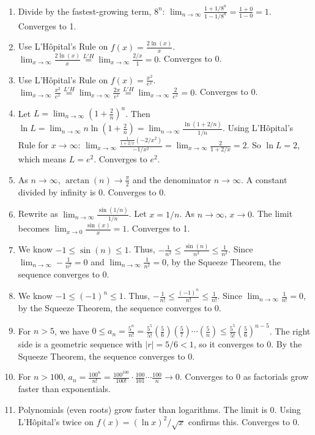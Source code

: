 \documentclass{article}
\begin{document}
\begin{enumerate}
    \item Divide by the fastest-growing term, $8^n$: $\lim_{n\to\infty} \frac{1 + 1/8^n}{1 - 1/8^n} = \frac{1+0}{1-0} = 1$. Converges to 1.
    \item Use L'Hôpital's Rule on $f(x) = \frac{2\ln(x)}{x}$. $\lim_{x\to\infty} \frac{2\ln(x)}{x} \overset{L'H}{=} \lim_{x\to\infty} \frac{2/x}{1} = 0$. Converges to 0.
    \item Use L'Hôpital's Rule on $f(x) = \frac{x^2}{e^x}$. $\lim_{x\to\infty} \frac{x^2}{e^x} \overset{L'H}{=} \lim_{x\to\infty} \frac{2x}{e^x} \overset{L'H}{=} \lim_{x\to\infty} \frac{2}{e^x} = 0$. Converges to 0.
    \item Let $L = \lim_{n\to\infty} (1 + \frac{2}{n})^n$. Then $\ln L = \lim_{n\to\infty} n \ln(1 + \frac{2}{n}) = \lim_{n\to\infty} \frac{\ln(1+2/n)}{1/n}$. Using L'Hôpital's Rule for $x \to \infty$: $\lim_{x\to\infty} \frac{\frac{1}{1+2/x}(-2/x^2)}{-1/x^2} = \lim_{x\to\infty} \frac{2}{1+2/x} = 2$. So $\ln L = 2$, which means $L=e^2$. Converges to $e^2$.
    \item As $n \to \infty$, $\arctan(n) \to \frac{\pi}{2}$ and the denominator $n \to \infty$. A constant divided by infinity is 0. Converges to 0.
    \item Rewrite as $\lim_{n\to\infty} \frac{\sin(1/n)}{1/n}$. Let $x = 1/n$. As $n\to\infty$, $x\to 0$. The limit becomes $\lim_{x\to 0} \frac{\sin(x)}{x} = 1$. Converges to 1.
    \item We know $-1 \le \sin(n) \le 1$. Thus, $-\frac{1}{n^2} \le \frac{\sin(n)}{n^2} \le \frac{1}{n^2}$. Since $\lim_{n\to\infty} -\frac{1}{n^2} = 0$ and $\lim_{n\to\infty} \frac{1}{n^2} = 0$, by the Squeeze Theorem, the sequence converges to 0.
    \item We know $-1 \le (-1)^n \le 1$. Thus, $-\frac{1}{n!} \le \frac{(-1)^n}{n!} \le \frac{1}{n!}$. Since $\lim_{n\to\infty} \frac{1}{n!} = 0$, by the Squeeze Theorem, the sequence converges to 0.
    \item For $n>5$, we have $0 \le a_n = \frac{5^n}{n!} = \frac{5^5}{5!} \left(\frac{5}{6}\right) \left(\frac{5}{7}\right) \cdots \left(\frac{5}{n}\right) \le \frac{5^5}{5!} \left(\frac{5}{6}\right)^{n-5}$. The right side is a geometric sequence with $|r| = 5/6 < 1$, so it converges to 0. By the Squeeze Theorem, the sequence converges to 0.
    \item For $n>100$, $a_n = \frac{100^n}{n!} = \frac{100^{100}}{100!} \cdot \frac{100}{101} \cdots \frac{100}{n} \to 0$. Converges to 0 as factorials grow faster than exponentials.
    \item Polynomials (even roots) grow faster than logarithms. The limit is 0. Using L'Hôpital's twice on $f(x) = (\ln x)^2 / \sqrt{x}$ confirms this. Converges to 0.

\end{enumerate}
\end{document}
